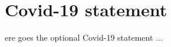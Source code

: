 %
%
%


\chapter*{Covid-19 statement}
\begin{SingleSpace}
ere goes the optional Covid-19 statement ...
\end{SingleSpace}
\clearpage